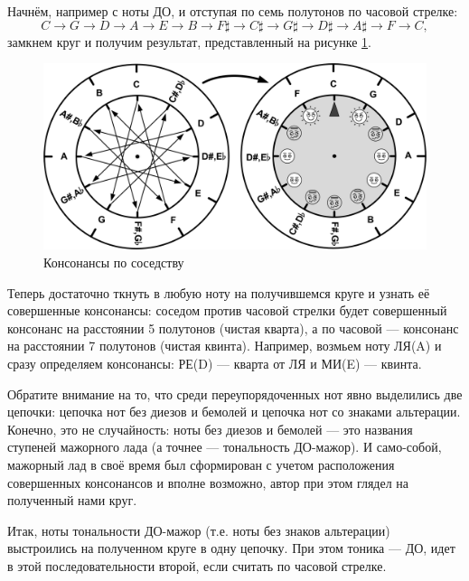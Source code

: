 Начнём, например с ноты ДО, и отступая по семь полутонов по часовой стрелке:
\[
    C\rightarrow 
    G\rightarrow 
    D\rightarrow 
    A\rightarrow 
    E\rightarrow 
    B\rightarrow 
    {F\sharp}\rightarrow
    {C\sharp}\rightarrow
    {G\sharp}\rightarrow
    {D\sharp}\rightarrow
    {A\sharp}\rightarrow
    F\rightarrow 
    C,
\]
замкнем круг и получим результат, представленный на рисунке \ref{fig:harmony:kvinto-kvarto:kons-rearrange}.

\begin{figure}[!ht]
    \centering
    \includegraphics[scale=0.7]{fig/kvinto-kvarto/kons-rearrange} 
    \caption{Консонансы по соседству}\label{fig:harmony:kvinto-kvarto:kons-rearrange}
\end{figure} 

Теперь достаточно ткнуть в любую ноту на получившемся круге и узнать её совершенные консонансы: соседом против часовой стрелки будет совершенный консонанс на расстоянии 5 полутонов (чистая кварта), а по часовой --- консонанс на расстоянии 7 полутонов (чистая квинта). Например, возмьем ноту ЛЯ(A) и сразу определяем консонансы: РЕ(D) --- кварта от ЛЯ и МИ(E) --- квинта.

Обратите внимание на то, что среди переупорядоченных нот явно выделились две цепочки: цепочка нот без диезов и бемолей и цепочка нот со знаками альтерации. Конечно, это не случайность: ноты без диезов и бемолей --- это названия ступеней мажорного лада (а точнее --- тональность ДО-мажор). И само-собой, мажорный лад в своё время был сформирован с учетом расположения совершенных консонансов и вполне возможно, автор при этом глядел на полученный нами круг.

Итак, ноты тональности ДО-мажор (т.е. ноты без знаков альтерации) выстроились на полученном круге в одну цепочку. При этом тоника --- ДО, идет в этой последовательности второй, если считать по часовой стрелке.

